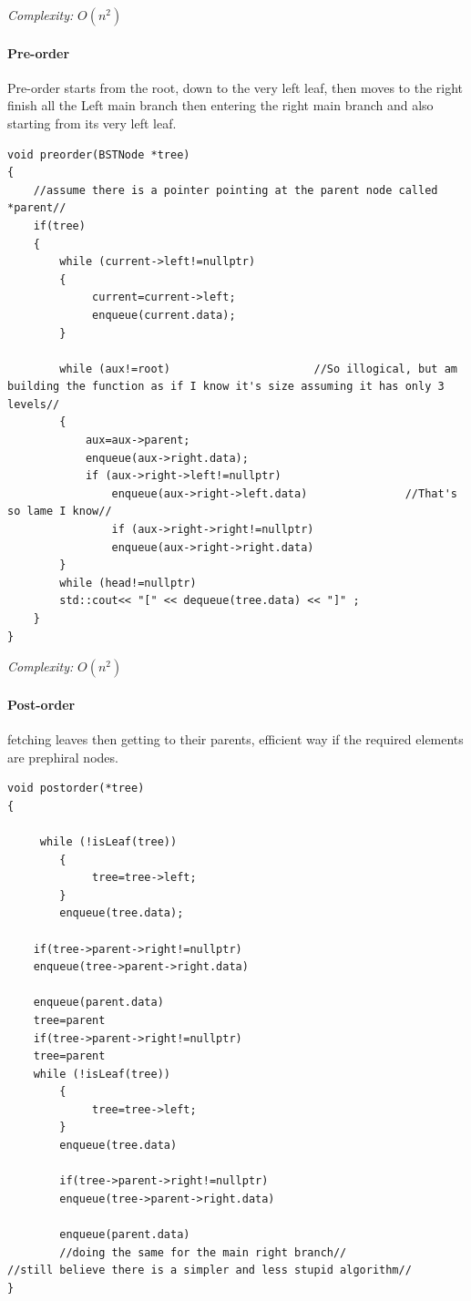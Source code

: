 \documentclass[10pt,a4paper]{article}
\begin{document}
\emph{Complexity:} $O(n^2)$

\paragraph{Pre-order} 
Pre-order starts from the root, down to the very left leaf, then moves to the right finish all the Left main branch then entering the right main branch and also starting from its very left leaf.

\begin{lstlisting}
void preorder(BSTNode *tree)
{
    //assume there is a pointer pointing at the parent node called *parent//
    if(tree)
    {
        while (current->left!=nullptr)
        {
             current=current->left;
             enqueue(current.data);
        }
        
        while (aux!=root)                      //So illogical, but am building the function as if I know it's size assuming it has only 3 levels//
        {
            aux=aux->parent;
            enqueue(aux->right.data);
            if (aux->right->left!=nullptr)
                enqueue(aux->right->left.data)               //That's so lame I know//
                if (aux->right->right!=nullptr)
                enqueue(aux->right->right.data)  
        }
        while (head!=nullptr)
        std::cout<< "[" << dequeue(tree.data) << "]" ;
    }
}
\end{lstlisting}

\emph{Complexity:} $O(n^2)$

\paragraph{Post-order}
fetching leaves then getting to their parents, efficient way if the required elements are prephiral nodes.

\begin{lstlisting}
void postorder(*tree)
{
    
     while (!isLeaf(tree))
        {
             tree=tree->left;
        }
        enqueue(tree.data);

    if(tree->parent->right!=nullptr)
    enqueue(tree->parent->right.data)
    
    enqueue(parent.data)
    tree=parent
    if(tree->parent->right!=nullptr)
    tree=parent
    while (!isLeaf(tree))
        {
             tree=tree->left;
        }
        enqueue(tree.data)

        if(tree->parent->right!=nullptr)
        enqueue(tree->parent->right.data)

        enqueue(parent.data)
        //doing the same for the main right branch//            //still believe there is a simpler and less stupid algorithm//
}
\end{lstlisting}
\end{document}
